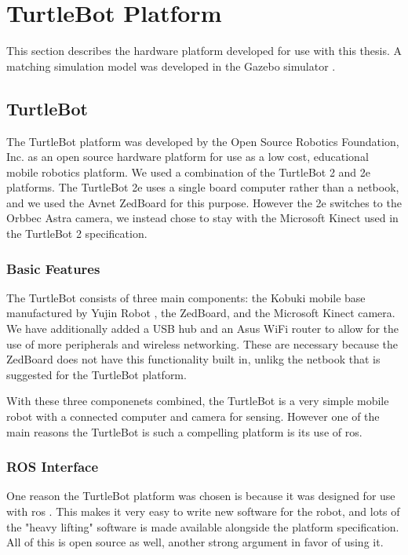 \documentclass[thesis.tex]{subfile}
\begin{document}
\chapter{TurtleBot Platform} \label{Hardware Platform}
This section describes the hardware platform developed for use with this thesis. A matching simulation model was developed in the Gazebo simulator \cite{Koenig}.

\section{TurtleBot}
The TurtleBot platform \cite{TurtleBot} was developed by the Open Source Robotics Foundation, Inc. as an open source hardware platform for use as a low cost, educational mobile robotics platform. We used a combination of the TurtleBot 2 and 2e platforms. The TurtleBot 2e uses a single board computer rather than a netbook, and we used the Avnet ZedBoard \cite{ZedBoard} for this purpose. However the 2e switches to the Orbbec Astra camera, we instead chose to stay with the Microsoft Kinect used in the TurtleBot 2 specification.

\subsection{Basic Features}
The TurtleBot consists of three main components: the Kobuki mobile base manufactured by Yujin Robot \cite{Kobuki}, the ZedBoard, and the Microsoft Kinect camera. We have additionally added a USB hub and an Asus WiFi router to allow for the use of more peripherals and wireless networking. These are necessary because the ZedBoard does not have this functionality built in, unlikg the netbook that is suggested for the TurtleBot platform.

With these three componenets combined, the TurtleBot is a very simple mobile robot with a connected computer and camera for sensing. However one of the main reasons the TurtleBot is such a compelling platform is its use of \gls{ros}.

\subsection{ROS Interface}
One reason the TurtleBot platform was chosen is because it was designed for use with \gls{ros} \cite{TurtleBotWiki}. This makes it very easy to write new software for the robot, and lots of the "heavy lifting" software is made available alongside the platform specification. All of this is open source as well, another strong argument in favor of using it.
\end{document}
